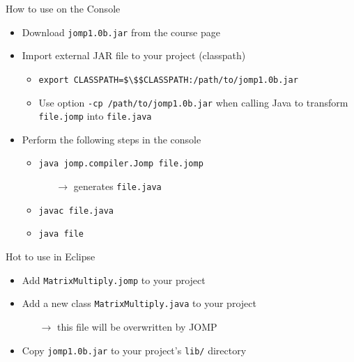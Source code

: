 \begin{frame}{How to use on the Console}
  \begin{itemize}
  \item Download \lstinline!jomp1.0b.jar! from the course page
  \item Import external JAR file to your project (classpath)
    \begin{itemize}
    \item \lstinline!export CLASSPATH=$\$$CLASSPATH:/path/to/jomp1.0b.jar!
    \item Use option \lstinline!-cp /path/to/jomp1.0b.jar! when
      calling Java to transform \lstinline!file.jomp! into
      \lstinline!file.java!
    \end{itemize}
  \item Perform the following steps in the console
    \begin{itemize}
    \item \lstinline!java jomp.compiler.Jomp file.jomp!
      \begin{itemize}
      \item[$\rightarrow$] generates \lstinline!file.java!
      \end{itemize}
    \item \lstinline!javac file.java!
    \item \lstinline!java file!
    \end{itemize}
  \end{itemize}
\end{frame}

\begin{frame}{Hot to use in Eclipse}
  \begin{itemize}
  \item Add \lstinline!MatrixMultiply.jomp! to your project
  \item Add a new class \lstinline!MatrixMultiply.java! to your
    project
    \begin{itemize}
    \item[$\rightarrow$] this file will be overwritten by JOMP
    \end{itemize}
  \item Copy \lstinline!jomp1.0b.jar! to your project's
    \lstinline!lib/! directory
  \end{itemize}
\end{frame}

